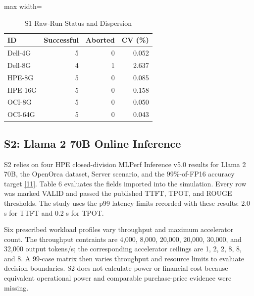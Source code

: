 \documentclass[final,3p,12pt,nopreprintline]{elsarticle}
\begin{document}
\begin{table}[htbp]
\caption{S1 Raw-Run Status and Dispersion}
\label{tab:s1quality}
\centering
\footnotesize
\setlength{\tabcolsep}{3pt}
\renewcommand{\arraystretch}{1.08}
\begin{adjustbox}{max width=\linewidth}
\begin{tabular}{lrrr}
\toprule
\textbf{ID} & \textbf{Successful} & \textbf{Aborted} & \textbf{CV (\%)}\\
\midrule
Dell-4G & 5 & 0 & 0.052\\
Dell-8G & 4 & 1 & 2.637\\
HPE-8G & 5 & 0 & 0.085\\
HPE-16G & 5 & 0 & 0.158\\
OCI-8G & 5 & 0 & 0.050\\
OCI-64G & 5 & 0 & 0.043\\
\bottomrule
\end{tabular}
\end{adjustbox}
\end{table}

\subsection{S2: Llama 2 70B Online Inference}


S2 relies on four HPE closed-division MLPerf Inference v5.0 results for Llama 2 70B, the OpenOrca dataset, Server scenario, and the 99\%-of-FP16 accuracy target \hyperref[ref:11]{[11]}. Table 6 evaluates the fields imported into the simulation. Every row was marked VALID and passed the published TTFT, TPOT, and ROUGE thresholds. The study uses the p99 latency limits recorded with these results: 2.0 s for TTFT and 0.2 s for TPOT.


Six prescribed workload profiles vary throughput and maximum accelerator count. The throughput contraints are 4,000, 8,000, 20,000, 20,000, 30,000, and 32,000 output tokens/s; the corresponding accelerator ceilings are 1, 2, 2, 8, 8, and 8. A 99-case matrix then varies throughput and resource limits to evaluate decision boundaries. S2 does not calculate power or financial cost because equivalent operational power and comparable purchase-price evidence were missing.
\end{document}
